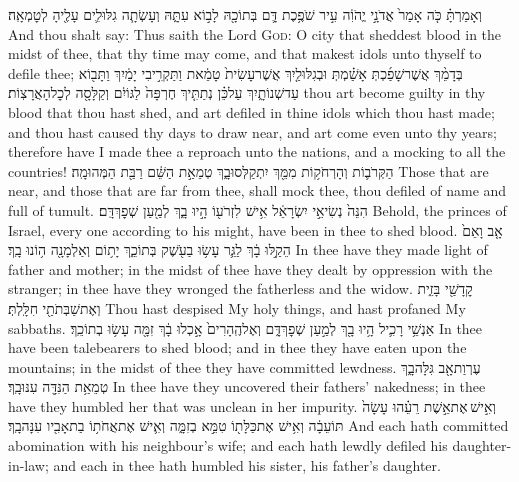 {וְאָמַרְתָּ֗ כֹּ֤ה אָמַר֙ אֲדֹנָ֣י יֱהֹוִ֔ה עִ֣יר שֹׁפֶ֥כֶת דָּ֛ם בְּתוֹכָ֖הּ לָב֣וֹא עִתָּ֑הּ וְעָשְׂתָ֧ה גִלּוּלִ֛ים עָלֶ֖יהָ לְטׇמְאָֽה׃}
{And thou shalt say: Thus saith the Lord \textsc{God}: O city that sheddest blood in the midst of thee, that thy time may come, and that makest idols unto thyself to defile thee;}
{בְּדָמֵ֨ךְ אֲשֶׁר\maqqaf שָׁפַ֜כְתְּ אָשַׁ֗מְתְּ וּבְגִלּוּלַ֤יִךְ אֲשֶׁר\maqqaf עָשִׂית֙ טָמֵ֔את וַתַּקְרִ֣יבִי יָמַ֔יִךְ וַתָּב֖וֹא עַד\maqqaf שְׁנוֹתָ֑יִךְ עַל\maqqaf כֵּ֗ן נְתַתִּ֤יךְ חֶרְפָּה֙ לַגּוֹיִ֔ם וְקַלָּסָ֖ה לְכׇל\maqqaf הָאֲרָצֽוֹת׃}
{thou art become guilty in thy blood that thou hast shed, and art defiled in thine idols which thou hast made; and thou hast caused thy days to draw near, and art come even unto thy years; therefore have I made thee a reproach unto the nations, and a mocking to all the countries!}
{הַקְּרֹב֛וֹת וְהָרְחֹק֥וֹת מִמֵּ֖ךְ יִתְקַלְּסוּ\maqqaf בָ֑ךְ טְמֵאַ֣ת הַשֵּׁ֔ם רַבַּ֖ת הַמְּהוּמָֽה׃}
{Those that are near, and those that are far from thee, shall mock thee, thou defiled of name and full of tumult.}
{הִנֵּה֙ נְשִׂיאֵ֣י יִשְׂרָאֵ֔ל אִ֥ישׁ לִזְרֹע֖וֹ הָ֣יוּ בָ֑ךְ לְמַ֖עַן שְׁפׇךְ\maqqaf דָּֽם׃}
{Behold, the princes of Israel, every one according to his might, have been in thee to shed blood.}
{אָ֤ב וָאֵם֙ הֵקַ֣לּוּ בָ֔ךְ לַגֵּ֛ר עָשׂ֥וּ בַעֹ֖שֶׁק בְּתוֹכֵ֑ךְ יָת֥וֹם וְאַלְמָנָ֖ה ה֥וֹנוּ בָֽךְ׃}
{In thee have they made light of father and mother; in the midst of thee have they dealt by oppression with the stranger; in thee have they wronged the fatherless and the widow.}
{קׇדָשַׁ֖י בָּזִ֑ית וְאֶת\maqqaf שַׁבְּתֹתַ֖י חִלָּֽלְתְּ׃}
{Thou hast despised My holy things, and hast profaned My sabbaths.}
{אַנְשֵׁ֥י רָכִ֛יל הָ֥יוּ בָ֖ךְ לְמַ֣עַן שְׁפׇךְ\maqqaf דָּ֑ם וְאֶל\maqqaf הֶֽהָרִים֙ אָ֣כְלוּ בָ֔ךְ זִמָּ֖ה עָשׂ֥וּ בְתוֹכֵֽךְ׃}
{In thee have been talebearers to shed blood; and in thee they have eaten upon the mountains; in the midst of thee they have committed lewdness.}
{עֶרְוַת\maqqaf אָ֖ב גִּלָּה\maqqaf בָ֑ךְ טְמֵאַ֥ת הַנִּדָּ֖ה עִנּוּ\maqqaf בָֽךְ׃}
{In thee have they uncovered their fathers’ nakedness; in thee have they humbled her that was unclean in her impurity.}
{וְאִ֣ישׁ \legarmeh  אֶת\maqqaf אֵ֣שֶׁת רֵעֵ֗הוּ עָשָׂה֙ תּוֹעֵבָ֔ה וְאִ֥ישׁ אֶת\maqqaf כַּלָּת֖וֹ טִמֵּ֣א בְזִמָּ֑ה וְאִ֛ישׁ אֶת\maqqaf אֲחֹת֥וֹ בַת\maqqaf אָבִ֖יו עִנָּה\maqqaf בָֽךְ׃}
{And each hath committed abomination with his neighbour’s wife; and each hath lewdly defiled his daughter-in-law; and each in thee hath humbled his sister, his father’s daughter.}

